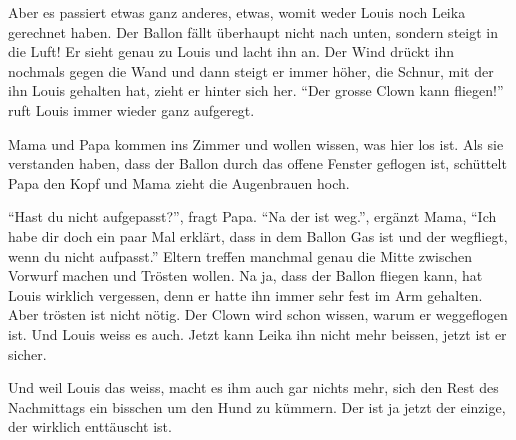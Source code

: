 Aber es passiert etwas ganz anderes, etwas, womit weder Louis noch Leika gerechnet haben. Der Ballon fällt überhaupt nicht nach unten, sondern steigt in die Luft! Er sieht genau zu Louis und lacht ihn an. Der Wind drückt ihn nochmals gegen die Wand und dann steigt er immer höher, die Schnur, mit der ihn Louis gehalten hat, zieht er hinter sich her.
\enquote{Der grosse Clown kann fliegen!} ruft Louis immer wieder ganz aufgeregt.

Mama und Papa kommen ins Zimmer und wollen wissen, was hier los ist. Als sie verstanden haben, dass der Ballon durch das offene Fenster geflogen ist, schüttelt Papa den Kopf und Mama zieht die Augenbrauen hoch.

\enquote{Hast du nicht aufgepasst?}, fragt Papa. \enquote{Na der ist weg.}, ergänzt Mama, \enquote{Ich habe dir doch ein paar Mal erklärt, dass in dem Ballon Gas ist und der wegfliegt, wenn du nicht aufpasst.} Eltern treffen manchmal genau die Mitte zwischen Vorwurf machen und Trösten wollen. Na ja, dass der Ballon fliegen kann, hat Louis wirklich vergessen, denn er hatte ihn immer sehr fest im Arm gehalten. Aber trösten ist nicht nötig. Der Clown wird schon wissen, warum er weggeflogen ist. Und Louis weiss es auch. Jetzt kann Leika ihn nicht mehr beissen, jetzt ist er sicher.

Und weil Louis das weiss, macht es ihm auch gar nichts mehr, sich den Rest des Nachmittags ein bisschen um den Hund zu kümmern. Der ist ja jetzt der einzige, der wirklich enttäuscht ist.  \hfill {\color{DeepPink}\decofourleft}

